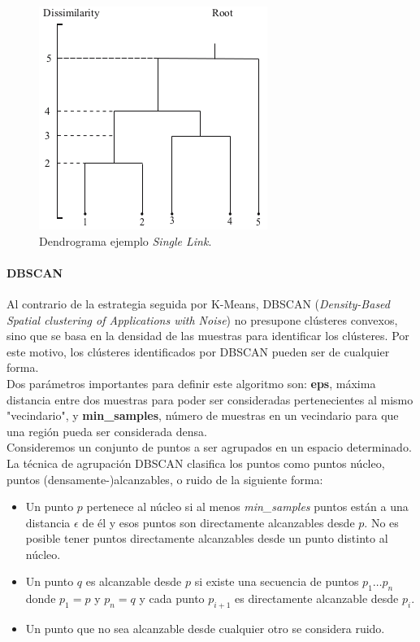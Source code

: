 \documentclass[a4paper, 20pt]{article}
\begin{document}
\begin{figure}[H]
	\centering
	\includegraphics[scale=0.6]{victoria/agloEjem}
	\caption{Dendrograma ejemplo \textit{Single Link}.}
	\label{fig:agloEjem}
\end{figure}

\paragraph{DBSCAN}

Al contrario de la estrategia seguida por K-Means, DBSCAN (\textit{Density-Based Spatial \textit{clustering} of Applications with Noise}) no presupone clústeres convexos, sino que se basa en la densidad de las muestras para identificar los clústeres. Por este motivo, los clústeres identificados por DBSCAN pueden ser de cualquier forma.\\

Dos parámetros importantes para definir este algoritmo son: \textbf{eps}, máxima distancia entre dos muestras para poder ser consideradas pertenecientes al mismo "vecindario", y \textbf{min\_samples}, número de muestras en un vecindario para que una región pueda ser considerada densa.\\

Consideremos un conjunto de puntos a ser agrupados en un espacio determinado. La técnica de agrupación DBSCAN clasifica los puntos como puntos núcleo, puntos (densamente-)alcanzables, o ruido de la siguiente forma:

\begin{itemize}
\item Un punto $p$ pertenece al núcleo si al menos \textit{min\_samples} puntos están a una distancia $\epsilon$ de él y esos puntos son directamente alcanzables desde $p$. No es posible tener puntos directamente alcanzables desde un punto distinto al núcleo.
\item Un punto $q$ es alcanzable desde $p$ si existe una secuencia de puntos $p_1\dots p_n$ donde $p_1=p$ y $p_n=q$ y cada punto $p_{i+1}$ es directamente alcanzable desde $p_i$.
\item Un punto que no sea alcanzable desde cualquier otro se considera ruido.
\end{itemize}
\end{document}
